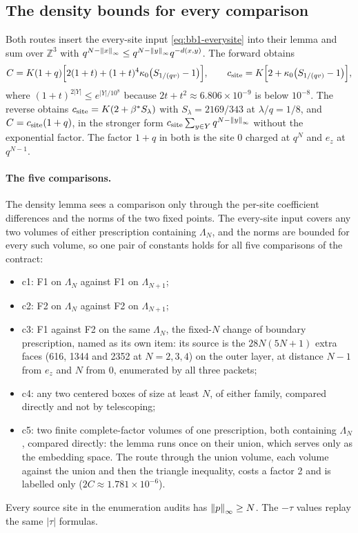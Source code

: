 \subsection{The density bounds for every comparison}
\label{sec:bb1-bounds}
Both routes insert the every-site input \eqref{eq:bb1-everysite} into their
lemma and sum over $\mathbb Z^3$ with
$q^{N-\left\lVert x\right\rVert_\infty}\le q^{N-\left\lVert y\right\rVert_\infty}q^{-d(x,y)}$. The forward obtains
\begin{equation}
 C=K(1+q)\Bigl[2(1+t)+(1+t)^4\kappa_0\bigl(S_{1/(qv)}-1\bigr)\Bigr],\qquad
 c_{\rm site}=K\Bigl[2+\kappa_0\bigl(S_{1/(qv)}-1\bigr)\Bigr],
 \label{eq:bb1-forward-constants}
\end{equation}
where $(1+t)^{2|Y|}\le e^{|Y|/10^8}$ because $2t+t^2\approx6.806\times10^{-9}$
is below $10^{-8}$. The reverse obtains
$c_{\rm site}=K(2+\beta^*S_\lambda)$ with $S_\lambda=2169/343$ at
$\lambda/q=1/8$, and $C=c_{\rm site}(1+q)$, in the stronger form
$c_{\rm site}\sum_{y\in Y}q^{N-\left\lVert y\right\rVert_\infty}$ without the exponential factor.
The factor $1+q$ in both is the site $0$ charged at $q^N$ and $e_z$ at
$q^{N-1}$.

\paragraph{The five comparisons.} The density lemma sees a comparison only
through the per-site coefficient differences and the norms of the two fixed
points. The every-site input covers any two volumes of either prescription
containing $\Lambda_N$, and the norms are bounded for every such volume, so
one pair of constants holds for all five comparisons of the contract:
\begin{itemize}
\item c1: F1 on $\Lambda_N$ against F1 on $\Lambda_{N+1}$;
\item c2: F2 on $\Lambda_N$ against F2 on $\Lambda_{N+1}$;
\item c3: F1 against F2 on the same $\Lambda_N$, the fixed-$N$ change of
 boundary prescription, named as its own item: its source is the
 $28N(5N+1)$ extra faces (616, 1344 and 2352 at $N=2,3,4$) on the outer layer,
 at distance $N-1$ from $e_z$ and $N$ from $0$, enumerated by all three
 packets;
\item c4: any two centered boxes of size at least $N$, of either family,
 compared directly and not by telescoping;
\item c5: two finite complete-factor volumes of one prescription, both
 containing $\Lambda_N$, compared directly: the lemma runs once on their
 union, which serves only as the embedding space. The route through the
 union volume, each volume against the union and then the triangle
 inequality, costs a factor 2 and is labelled only ($2C\approx1.781\times
 10^{-6}$).
\end{itemize}
Every source site in the enumeration audits has $\left\lVert p\right\rVert_\infty\ge N$. The
$-\tau$ values replay the same $|\tau|$ formulas.

